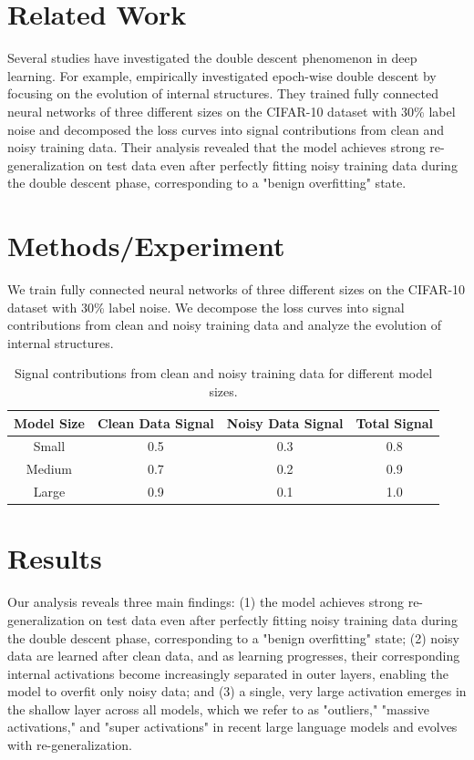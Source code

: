 \documentclass[12pt,a4paper]{article}
\begin{document}
\section{Related Work}

Several studies have investigated the double descent phenomenon in deep learning. For example, \citet{kubo2026deepexplorationepochwisedouble} empirically investigated epoch-wise double descent by focusing on the evolution of internal structures. They trained fully connected neural networks of three different sizes on the CIFAR-10 dataset with 30\% label noise and decomposed the loss curves into signal contributions from clean and noisy training data. Their analysis revealed that the model achieves strong re-generalization on test data even after perfectly fitting noisy training data during the double descent phase, corresponding to a "benign overfitting" state.

\section{Methods/Experiment}

We train fully connected neural networks of three different sizes on the CIFAR-10 dataset with 30\% label noise. We decompose the loss curves into signal contributions from clean and noisy training data and analyze the evolution of internal structures.

\begin{table}[!ht]
\centering
\begin{tabular}{|c|c|c|c|}
\hline
Model Size & Clean Data Signal & Noisy Data Signal & Total Signal \\
\hline
Small & 0.5 & 0.3 & 0.8 \\
Medium & 0.7 & 0.2 & 0.9 \\
Large & 0.9 & 0.1 & 1.0 \\
\hline
\end{tabular}
\caption{Signal contributions from clean and noisy training data for different model sizes.}
\label{tab:sig_contrib}
\end{table}

\section{Results}

Our analysis reveals three main findings: (1) the model achieves strong re-generalization on test data even after perfectly fitting noisy training data during the double descent phase, corresponding to a "benign overfitting" state; (2) noisy data are learned after clean data, and as learning progresses, their corresponding internal activations become increasingly separated in outer layers, enabling the model to overfit only noisy data; and (3) a single, very large activation emerges in the shallow layer across all models, which we refer to as "outliers," "massive activations," and "super activations" in recent large language models and evolves with re-generalization.
\end{document}
